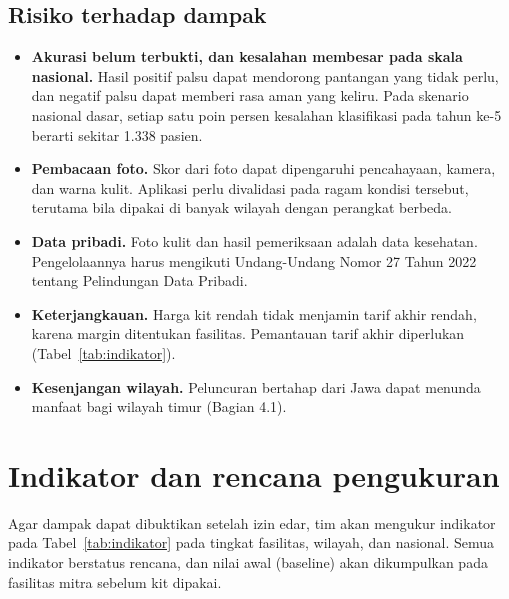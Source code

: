 \documentclass[11pt,a4paper]{article}
\begin{document}
\subsection{Risiko terhadap dampak}

\begin{itemize}
\item \textbf{Akurasi belum terbukti, dan kesalahan membesar pada skala nasional.} Hasil positif palsu dapat mendorong pantangan yang tidak perlu, dan negatif palsu dapat memberi rasa aman yang keliru. Pada skenario nasional dasar, setiap satu poin persen kesalahan klasifikasi pada tahun ke-5 berarti sekitar 1.338 pasien.
\item \textbf{Pembacaan foto.} Skor dari foto dapat dipengaruhi pencahayaan, kamera, dan warna kulit. Aplikasi perlu divalidasi pada ragam kondisi tersebut, terutama bila dipakai di banyak wilayah dengan perangkat berbeda.
\item \textbf{Data pribadi.} Foto kulit dan hasil pemeriksaan adalah data kesehatan. Pengelolaannya harus mengikuti Undang-Undang Nomor 27 Tahun 2022 tentang Pelindungan Data Pribadi.
\item \textbf{Keterjangkauan.} Harga kit rendah tidak menjamin tarif akhir rendah, karena margin ditentukan fasilitas. Pemantauan tarif akhir diperlukan (Tabel~\ref{tab:indikator}).
\item \textbf{Kesenjangan wilayah.} Peluncuran bertahap dari Jawa dapat menunda manfaat bagi wilayah timur (Bagian 4.1).
\end{itemize}

\section{Indikator dan rencana pengukuran}

Agar dampak dapat dibuktikan setelah izin edar, tim akan mengukur indikator pada Tabel~\ref{tab:indikator} pada tingkat fasilitas, wilayah, dan nasional. Semua indikator berstatus rencana, dan nilai awal (baseline) akan dikumpulkan pada fasilitas mitra sebelum kit dipakai.
\end{document}
